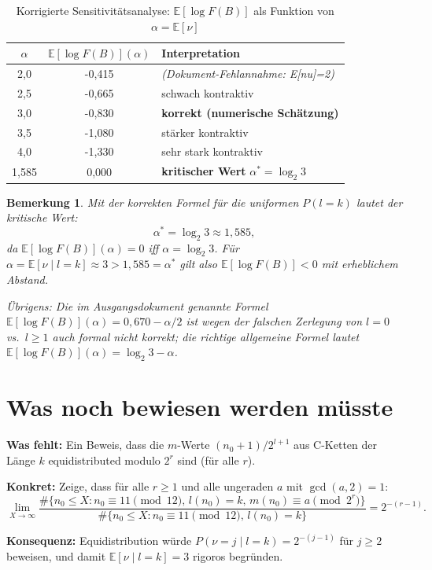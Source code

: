 \documentclass[12pt,a4paper]{article}
\newtheorem{bemerkung}[definition]{Bemerkung}
\newcommand{\E}{\mathbb{E}}
\newcommand{\logF}{\log F(B)}
\begin{document}
\begin{table}[h!]
\centering
\caption{Korrigierte Sensitivitätsanalyse: $\E[\logF]$ als Funktion von $\alpha = \E[\nu]$}
\label{tab:sensitivitaet_korr}
\renewcommand{\arraystretch}{1.3}
\begin{tabular}{
  S[table-format=1.1]
  S[table-format=+1.4]
  l
}
\toprule
{$\alpha$} & {$\E[\logF](\alpha)$} & Interpretation \\
0 & -0{,}415 & \textit{(Dokument-Fehlannahme: E[nu]=2)} \\
2{,}5 & -0{,}665 & schwach kontraktiv \\
3{,}0 & -0{,}830 & \textbf{korrekt (numerische Schätzung)} \\
3{,}5 & -1{,}080 & stärker kontraktiv \\
4{,}0 & -1{,}330 & sehr stark kontraktiv \\
\midrule
{1{,}585} & {0{,}000} & \textbf{kritischer Wert} $\alpha^* = \log_2 3$ \\
\bottomrule
\end{tabular}
\end{table}

\begin{bemerkung}
Mit der korrekten Formel für die uniformen $P(l{=}k)$ lautet der kritische Wert:
\[
  \alpha^* = \log_2 3 \approx 1{,}585,
\]
da $\E[\logF](\alpha) = 0$ iff $\alpha = \log_2 3$.
Für $\alpha = \E[\nu \mid l{=}k] \approx 3 > 1{,}585 = \alpha^*$ gilt
also $\E[\logF] < 0$ mit erheblichem Abstand.

Übrigens: Die im Ausgangsdokument genannte Formel $\E[\logF](\alpha) = 0{,}670 - \alpha/2$
ist wegen der falschen Zerlegung von $l{=}0$ vs.\ $l{\geq}1$ auch formal nicht korrekt;
die richtige allgemeine Formel lautet $\E[\logF](\alpha) = \log_2 3 - \alpha$.
\end{bemerkung}

\section{Was noch bewiesen werden müsste}
\label{sec:offene_probleme}

\begin{tcolorbox}[lücke, title={Offenes Problem 1: Maßstruktur und Equidistribution}]
\textbf{Was fehlt:}
Ein Beweis, dass die $m$-Werte $(n_0 + 1)/2^{l+1}$ aus C-Ketten der Länge $k$
equidistributed modulo $2^r$ sind (für alle $r$).

\medskip
\textbf{Konkret:} Zeige, dass für alle $r \geq 1$ und alle ungeraden $a$ mit
$\gcd(a, 2) = 1$:
\[
  \lim_{X \to \infty}
  \frac{\#\{n_0 \leq X : n_0 \equiv 11 \pmod{12},\, l(n_0)=k,\, m(n_0) \equiv a \pmod{2^r}\}}
  {\#\{n_0 \leq X : n_0 \equiv 11 \pmod{12},\, l(n_0)=k\}}
  = 2^{-(r-1)}.
\]

\textbf{Konsequenz:} Equidistribution würde $P(\nu{=}j \mid l{=}k) = 2^{-(j-1)}$ für
$j \geq 2$ beweisen, und damit $\E[\nu \mid l{=}k] = 3$ rigoros begründen.
\end{tcolorbox}
\end{document}
